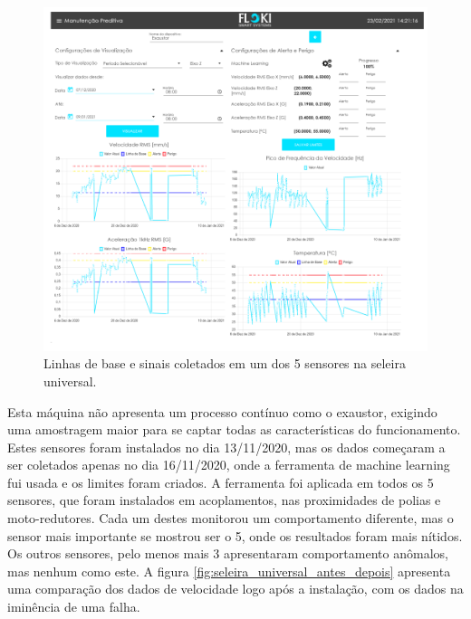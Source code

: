 \begin{figure}[H]
    \caption{Linhas de base e sinais coletados em um dos 5 sensores na seleira universal.}
    \begin{center}
        \includegraphics[scale=0.9, page=4]{resultados/img/resultados.pdf}
    \end{center}
    \label{fig:seleira_universal}
\end{figure}

Esta máquina não apresenta um processo contínuo como o exaustor, exigindo uma amostragem maior para se captar todas as características do 
funcionamento. Estes sensores foram instalados no dia 13/11/2020, mas os dados começaram a ser coletados apenas no dia 16/11/2020, onde a 
ferramenta de machine learning fui usada e os limites foram criados. 
A ferramenta foi aplicada em todos os 5 sensores, que foram instalados em acoplamentos, nas proximidades de polias e moto-redutores.
Cada um destes monitorou um comportamento diferente, mas o sensor mais importante se mostrou ser o 5, onde os resultados foram mais nítidos. 
Os outros sensores, pelo menos mais 3 apresentaram comportamento anômalos, mas nenhum como este. A figura \ref{fig:seleira_universal_antes_depois}
apresenta uma comparação dos dados de velocidade logo após a instalação, com os dados na iminência de uma falha.

